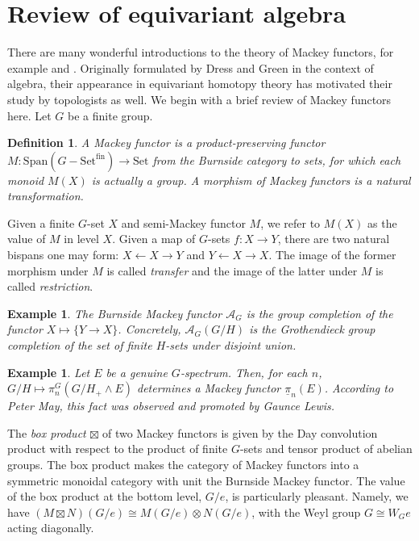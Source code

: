 \documentclass[11pt,dvipsnames]{amsart}
\theoremstyle{BoldRemark}
\newtheorem{example}[theorem]{Example}
\newtheorem{definition}[theorem]{Definition}
\newcommand{\Set}{\mathrm{Set}}
\begin{document}
\section{Review of equivariant algebra}\label{sec:review}

There are many wonderful introductions to the theory of Mackey functors, for example \cite{Web00} and \cite{Str12}. Originally formulated by Dress \cite{Dre71} and Green \cite{Gre71} in the context of algebra, their appearance in equivariant homotopy theory has motivated their study by topologists as well. We begin with a brief review of Mackey functors here. Let $G$ be a finite group.

\begin{definition}
	A Mackey functor is a product-preserving functor $M : \mathrm{Span}(G-\Set^{\mathrm{fin}}) \rightarrow \Set$ from the Burnside category to sets, for which each monoid $M(X)$ is actually a group. A morphism of Mackey functors is a natural transformation.
\end{definition}

Given a finite $G$-set $X$ and semi-Mackey functor $M$, we refer to $M(X)$ as the value of $M$ in level $X$. Given a map of $G$-sets $f : X \rightarrow Y$, there are two natural bispans one may form: $X \leftarrow X \rightarrow Y$ and $Y \leftarrow X \rightarrow X$. The image of the former morphism under $M$ is called \emph{transfer} and the image of the latter under $M$ is called \emph{restriction}.

\begin{example}
	The Burnside Mackey functor $\mathcal{A}_G$ is the group completion of the functor $X \mapsto \{ Y \rightarrow X \}$. Concretely, $\mathcal{A}_G(G/H)$ is the Grothendieck group completion of the set of finite $H$-sets under disjoint union.
\end{example}

\begin{example}
	Let $E$ be a genuine $G$-spectrum. Then, for each $n$, $G/H \mapsto \pi_n^G(G/H_+ \wedge E)$ determines a Mackey functor $\underline{\pi}_n(E)$. According to Peter May, this fact was observed and promoted by Gaunce Lewis.
\end{example}

The \emph{box product} $\boxtimes$ of two Mackey functors is given by the Day convolution product with respect to the product of finite $G$-sets and tensor product of abelian groups. The box product makes the category of Mackey functors into a symmetric monoidal category with unit the Burnside Mackey functor. The value of the box product at the bottom level, $G/e$, is particularly pleasant. Namely, we have $(M \boxtimes N)(G/e) \cong M(G/e) \otimes N(G/e)$, with the Weyl group $G \cong W_G e$ acting diagonally.
\end{document}
